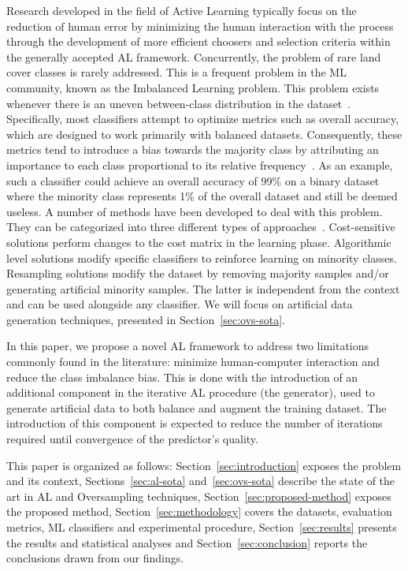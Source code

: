 \documentclass[parskip=full]{scrartcl}
\begin{document}
Research developed in the field of Active Learning typically focus on the
reduction of human error by minimizing the human interaction with the process
through the development of more efficient choosers and selection criteria within
the generally accepted AL framework.  Concurrently, the problem of rare land
cover classes is rarely addressed. This is a frequent problem in the ML
community, known as the Imbalanced Learning problem. This problem exists
whenever there is an uneven between-class distribution in the
dataset~\cite{Chawla2004}. Specifically, most classifiers attempt to
optimize metrics such as overall accuracy, which are designed to work primarily
with balanced datasets. Consequently, these metrics tend to introduce a bias
towards the majority class by attributing an importance to each class
proportional to its relative frequency~\cite{Maxwell2018}. As an example, such a
classifier could achieve an overall accuracy of 99\% on a binary dataset where
the minority class represents 1\% of the overall dataset and still be deemed
useless. A number of methods have been developed to deal with this problem. They
can be categorized into three different types of
approaches~\cite{Fernandez2013,Kaur2019}. Cost-sensitive solutions perform
changes to the cost matrix in the learning phase. Algorithmic level solutions
modify specific classifiers to reinforce learning on minority classes.
Resampling solutions modify the dataset by removing majority samples and/or
generating artificial minority samples. The latter is independent from the
context and can be used alongside any classifier. We will focus on artificial
data generation techniques, presented in Section~\ref{sec:ovs-sota}.

In this paper, we propose a novel AL framework to address two limitations
commonly found in the literature: minimize human-computer interaction and reduce
the class imbalance bias. This is done with the introduction of an additional
component in the iterative AL procedure (the generator), used to generate
artificial data to both balance and augment the training dataset. The
introduction of this component is expected to reduce the number of iterations
required until convergence of the predictor's quality.

This paper is organized as follows: Section~\ref{sec:introduction} exposes the
problem and its context, Sections~\ref{sec:al-sota} and~\ref{sec:ovs-sota}
describe the state of the art in AL and Oversampling techniques,
Section~\ref{sec:proposed-method} exposes the proposed method,
Section~\ref{sec:methodology} covers the datasets, evaluation metrics, ML
classifiers and experimental procedure, Section~\ref{sec:results} presents the
results and statistical analyses and Section~\ref{sec:conclusion} reports the
conclusions drawn from our findings.
\end{document}
